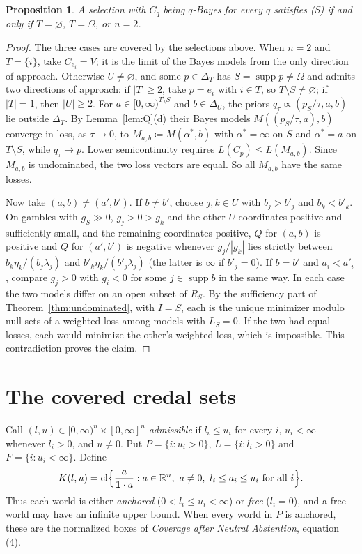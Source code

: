 \documentclass[11pt]{article}
\newtheorem{proposition}[theorem]{Proposition}
\theoremstyle{remark}\newtheorem{remark}[theorem]{Remark}
\newcommand{\R}{\mathbb R}
\newcommand{\supp}{\operatorname{supp}}
\newcommand{\cl}{\operatorname{cl}}
\newcommand{\one}{\mathbf 1}
\begin{document}
\begin{proposition}\label{prop:bayessel}
A selection with $C_q$ being $q$-Bayes for every $q$ satisfies (S) if and
only if $T=\varnothing$, $T=\Omega$, or $n=2$.
\end{proposition}
\begin{proof}
The three cases are covered by the selections above. When $n=2$ and
$T=\{i\}$, take $C_{e_i}=V$; it is the limit of the Bayes models from the
only direction of approach. Otherwise $U\ne\varnothing$, and some $p\in\Delta_T$ has
$S=\supp p\ne\Omega$ and admits two directions of approach: if $|T|\ge2$,
take $p=e_i$ with $i\in T$, so $T\setminus S\ne\varnothing$; if $|T|=1$,
then $|U|\ge2$. For $a\in[0,\infty)^{T\setminus S}$ and $b\in\Delta_U$, the
priors $q_\tau\propto(p_S/\tau,a,b)$ lie outside $\Delta_T$. By
Lemma~\ref{lem:Q}(d) their Bayes models $M((p_S/\tau,a),b)$ converge in
loss, as $\tau\to0$, to $M_{a,b}\coloneqq M(\alpha^*,b)$ with
$\alpha^*=\infty$ on $S$ and $\alpha^*=a$ on $T\setminus S$, while
$q_\tau\to p$. Lower semicontinuity requires $L(C_p)\le L(M_{a,b})$. Since
$M_{a,b}$ is undominated, the two loss vectors are equal. So all $M_{a,b}$
have the same losses.

Now take $(a,b)\ne(a',b')$. If $b\ne b'$, choose $j,k\in U$ with
$b_j>b'_j$ and $b_k<b'_k$. On gambles with $g_S\gg0$, $g_j>0>g_k$ and
the other $U$-coordinates positive and sufficiently small, and the
remaining coordinates positive, $Q$ for $(a,b)$ is positive and $Q$ for
$(a',b')$ is negative whenever $g_j/|g_k|$ lies strictly between
$b_k\eta_k/(b_j\lambda_j)$ and $b'_k\eta_k/(b'_j\lambda_j)$ (the latter is
$\infty$ if $b'_j=0$). If $b=b'$ and $a_i<a'_i$, compare $g_j>0$
with $g_i<0$ for some $j\in\supp b$ in the same way. In each case the two
models differ on an open subset of $R_S$. By the sufficiency part of
Theorem~\ref{thm:undominated}, with $I=S$, each is the unique minimizer
modulo null sets of a weighted loss among models with $L_S=0$. If the two
had equal losses, each would minimize the other's weighted loss, which is
impossible. This contradiction proves the claim.
\end{proof}

\section{The covered credal sets}

Call $(l,u)\in[0,\infty)^n\times[0,\infty]^n$ \emph{admissible} if
$l_i\le u_i$ for every $i$, $u_i<\infty$ whenever $l_i>0$, and $u\ne0$.
Put $P=\{i:u_i>0\}$, $L=\{i:l_i>0\}$ and $F=\{i:u_i<\infty\}$. Define
\[
 K(l,u)=\cl\Bigl\{\frac{a}{\one\cdot a}:a\in\R^n,\ a\ne0,\
 l_i\le a_i\le u_i\text{ for all }i\Bigr\}.
\]
Thus each world is either \emph{anchored} ($0<l_i\le u_i<\infty$) or
\emph{free} ($l_i=0$), and a free world may have an infinite upper bound.
When every world in $P$ is anchored, these are the normalized boxes of
\emph{Coverage after Neutral Abstention}, equation (4).
\end{document}
